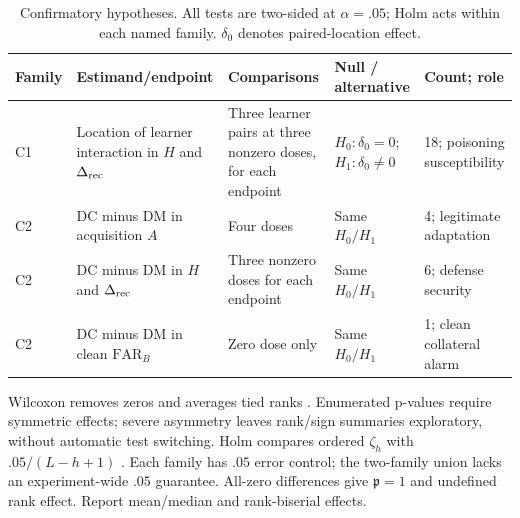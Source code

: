 \documentclass[10pt,a4paper]{article}
\begin{document}
\begin{table}[htbp]
\centering\footnotesize
\caption{Confirmatory hypotheses. All tests are two-sided at $\alpha=.05$; Holm acts within each named family. $\delta_0$ denotes paired-location effect.}
\label{tab:hypotheses}
\begin{tabularx}{\linewidth}{L{0.8cm}Y Y L{2.4cm}L{2.5cm}}
\toprule
Family & Estimand/endpoint & Comparisons & Null / alternative & Count; role\\
\midrule
C1 & Location of learner interaction in $H$ and $\Delta_{\rm rec}$ & Three learner pairs at three nonzero doses, for each endpoint & $H_0:\delta_0=0$; $H_1:\delta_0\ne0$ & 18; poisoning susceptibility\\
C2 & DC minus DM in acquisition $A$ & Four doses & Same $H_0/H_1$ & 4; legitimate adaptation\\
C2 & DC minus DM in $H$ and $\Delta_{\rm rec}$ & Three nonzero doses for each endpoint & Same $H_0/H_1$ & 6; defense security\\
C2 & DC minus DM in clean $\mathrm{FAR}_B$ & Zero dose only & Same $H_0/H_1$ & 1; clean collateral alarm\\
\bottomrule
\end{tabularx}
\end{table}
Wilcoxon removes zeros and averages tied ranks \cite{wilcoxon}. Enumerated p-values require symmetric effects; severe asymmetry leaves rank/sign summaries exploratory, without automatic test switching. Holm compares ordered $\zeta_h$ with $.05/(L-h+1)$ \cite{holm}. Each family has $.05$ error control; the two-family union lacks an experiment-wide $.05$ guarantee. All-zero differences give $\mathfrak p=1$ and undefined rank effect. Report mean/median and rank-biserial effects.
\end{document}
